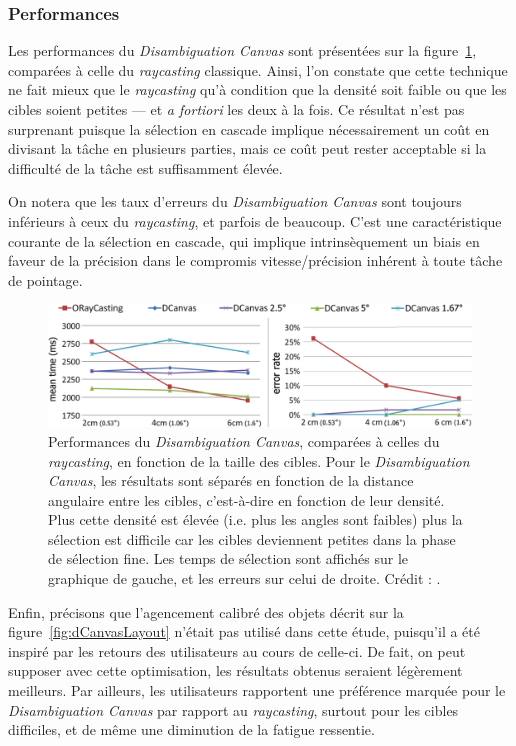 	\subsubsection{Performances}
	Les performances du \emph{Disambiguation Canvas} sont présentées sur la figure~\ref{fig:dCanvasRCPerf}, comparées à celle du \emph{raycasting} classique. Ainsi, l'on constate que cette technique ne fait mieux que le \emph{raycasting} qu'à condition que la densité soit faible ou que les cibles soient petites --- et \emph{a fortiori} les deux à la fois. Ce résultat n'est pas surprenant puisque la sélection en cascade implique nécessairement un coût en divisant la tâche en plusieurs parties, mais ce coût peut rester acceptable si la difficulté de la tâche est suffisamment élevée.
	
	On notera que les taux d'erreurs du \emph{Disambiguation Canvas} sont toujours inférieurs à ceux du \emph{raycasting}, et parfois de beaucoup. C'est une caractéristique courante de la sélection en cascade, qui implique intrinsèquement un biais en faveur de la précision dans le compromis vitesse/précision inhérent à toute tâche de pointage.
	
	\begin{figure}[!htb]
		\centering
		\includegraphics[width=\textwidth]{figures/ch2/dCanvasRCPerf}
		\caption[\emph{Disambiguation Canvas} -- performances I]{Performances du \emph{Disambiguation Canvas}, comparées à celles du \emph{raycasting}, en fonction de la taille des cibles. Pour le \emph{Disambiguation Canvas}, les résultats sont séparés en fonction de la distance angulaire entre les cibles, c'est-à-dire en fonction de leur densité. Plus cette densité est élevée (i.e. plus les angles sont faibles) plus la sélection est difficile car les cibles deviennent petites dans la phase de sélection fine. Les temps de sélection sont affichés sur le graphique de gauche, et les erreurs sur celui de droite. Crédit : \cite{debarba2013disambiguation}.}
		\label{fig:dCanvasRCPerf}
	\end{figure}

	Enfin, précisons que l'agencement calibré des objets décrit sur la figure~\ref{fig:dCanvasLayout} n'était pas utilisé dans cette étude, puisqu'il a été inspiré par les retours des utilisateurs au cours de celle-ci. De fait, on peut supposer avec cette optimisation, les résultats obtenus seraient légèrement meilleurs. Par ailleurs, les utilisateurs rapportent une préférence marquée pour le \emph{Disambiguation Canvas} par rapport au \emph{raycasting}, surtout pour les cibles difficiles, et de même une diminution de la fatigue ressentie.
	
